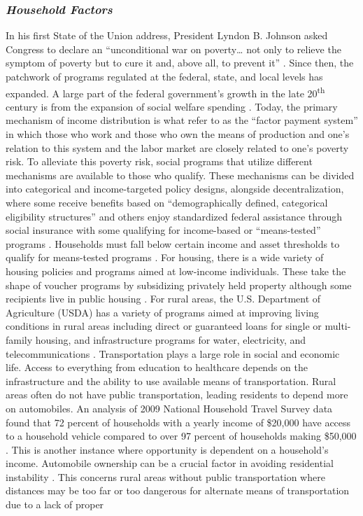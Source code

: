  

 

\subsubsection{\textit{Household Factors}} 

In his first State of the Union address, President Lyndon B. Johnson asked Congress to declare an “unconditional war on poverty… not only to relieve the symptom of poverty but to cure it and, above all, to prevent it” \citep{the_american_presidency_project_annual_nodate}. Since then, the patchwork of programs regulated at the federal, state, and local levels has expanded. A large part of the federal government's growth in the late 20\textsuperscript{th} century is from the expansion of social welfare spending \citep{fishback_social_2020}. Today, the primary mechanism of income distribution is what \citet{berkowitz_gaps_2023} refer to as the “factor payment system” in which those who work and those who own the means of production and one’s relation to this system and the labor market are closely related to one’s poverty risk. To alleviate this poverty risk, social programs that utilize different mechanisms are available to those who qualify. These mechanisms can be divided into categorical and income-targeted policy designs, alongside decentralization, where some receive benefits based on “demographically defined, categorical eligibility structures” and others enjoy standardized federal assistance through social insurance with some qualifying for income-based or “means-tested” programs \citep{bruch_poverty_2023}. Households must fall below certain income and asset thresholds to qualify for means-tested programs \citep{rank_welfare_2002}. For housing, there is a wide variety of housing policies and programs aimed at low-income individuals. These take the shape of voucher programs by subsidizing privately held property although some recipients live in public housing \citep{kim_housing_2017}. For rural areas, the U.S. Department of Agriculture (USDA) has a variety of programs aimed at improving living conditions in rural areas including direct or guaranteed loans for single or multi-family housing, and infrastructure programs for water, electricity, and telecommunications \citep{us_department_of_agriculture_usda_2023}. Transportation plays a large role in social and economic life. Access to everything from education to healthcare depends on the infrastructure and the ability to use available means of transportation. Rural areas often do not have public transportation, leading residents to depend more on automobiles. An analysis of 2009 National Household Travel Survey data found that 72 percent of households with a yearly income of \$20,000 have access to a household vehicle compared to over 97 percent of households making \$50,000 \citep{blumenberg_automobile_2012}. This is another instance where opportunity is dependent on a household's income. Automobile ownership can be a crucial factor in avoiding residential instability \citep{kang_why_2019}. This concerns rural areas without public transportation where distances may be too far or too dangerous for alternate means of transportation due to a lack of proper 